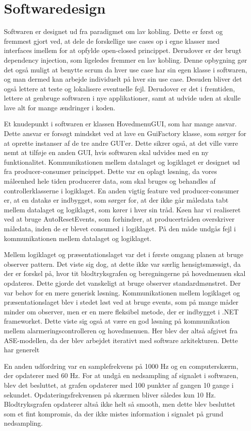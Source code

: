 \section{Softwaredesign}
Softwaren er designet ud fra paradigmet om lav kobling. Dette er først og fremmest gjort ved, at dele de forskellige use cases op i egne klasser med interfaces imellem for at opfylde open-closed princippet. Derudover er der brugt dependency injection, som ligeledes fremmer en lav kobling. Denne opbygning gør det også muligt at benytte scrum  da hver use case har sin egen klasse i softwaren, og man dermed kan arbejde individuelt på hver sin use case. Desuden bliver det også lettere at teste og lokalisere eventuelle fejl. Derudover er det i fremtiden, lettere at genbruge softwaren i nye applikationer, samt at udvide uden at skulle lave alt for mange ændringer i koden. 

Et knudepunkt i softwaren er klassen HovedmenuGUI, som har mange ansvar. Dette ansvar er forsøgt mindsket ved at lave en GuiFactory klasse, som sørger for at oprette instanser af de tre andre GUI’er. Dette sikrer også, at det ville være nemt at tilføje en anden GUI, hvis softwaren skal udvides med en ny funktionalitet.
Kommunikationen mellem datalaget og logiklaget er designet ud fra producer-consumer princippet. Dette var en oplagt løsning, da vores måleenhed hele tiden producerer data, som skal bruges og behandles af controllerklasserne i logiklaget. En anden vigtig feature ved producer-consumer er, at en datakø er indbygget, som sørger for, at der ikke går måledata tabt mellem datalaget og logiklaget, som kører i hver sin tråd. Køen har vi realiseret ved at bruge AutoResetEvents, som forhindrer, at producertråden overskriver måledata, inden de er blevet consumed i logiklaget. På den måde undgås fejl i kommunikationen mellem datalaget og logiklaget.

Mellem logiklaget og præsentationslaget var det i første omgang planen at bruge observer pattern. Det viste sig dog, at dette ikke var særlig hensigtsmæssigt, da der er forskel på, hvor tit blodtryksgrafen og beregningerne på hovedmenuen skal opdateres. Dette gjorde det vanskeligt at bruge observer standardmønstret. Der var behov for en mere generisk løsning. Kommunikationen mellem logiklaget og præsentationslaget blev i stedet løst ved at bruge events, som på mange måder minder om observer, men er en mere fleksibel metode, der er indbygget i .NET frameworket. Dette viste sig også at være en god løsning på kommunikation mellem alarmeringscontrolleren og hovedmenuen. Her blev der altså afgivet fra ASE-modellen, da der blev arbejdet iterativt med software arkitekturen. Dette har generelt 

En anden udfordring var en samplefrekvens på 1000 Hz og en computerskærm, der opdaterer med 60 Hz. For at undgå en nedsampling af signalet i softwaren, blev det besluttet, at grafen opdaterer med 100 punkter af gangen 10 gange i sekundet. Opdateringsfrekvensen på skærmen bliver således kun 10 Hz. Blodtryksgrafen opdaterer altså ikke helt så smooth, men dette blev besluttet som et fint kompromis, da der ikke mistes information i signalet på grund nedsampling.


